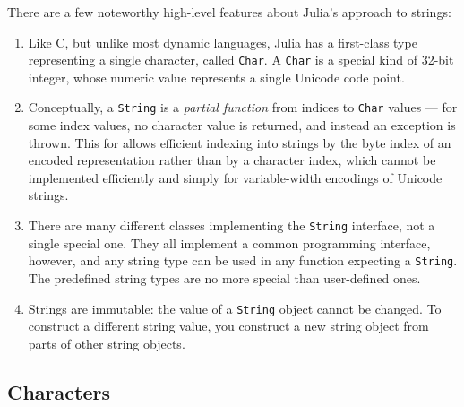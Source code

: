 \documentclass{article}
\begin{document}
There are a few noteworthy high-level features about Julia's approach to strings:
\begin{enumerate}
\item Like C, but unlike most dynamic languages, Julia has a first-class type representing a single character, called \verb|Char|.
A \verb|Char| is a special kind of 32-bit integer, whose numeric value represents a single Unicode code point.
\item Conceptually, a \verb|String| is a \emph{partial function} from indices to \verb|Char| values --- for some index values, no character value is returned, and instead an exception is thrown.
This for allows efficient indexing into strings by the byte index of an encoded representation rather than by a character index, which cannot be implemented efficiently and simply for variable-width encodings of Unicode strings.
\item There are many different classes implementing the \verb|String| interface, not a single special one.
They all implement a common programming interface, however, and any string type can be used in any function expecting a \verb|String|.
The predefined string types are no more special than user-defined ones.
\item Strings are immutable: the value of a \verb|String| object cannot be changed.
To construct a different string value, you construct a new string object from parts of other string objects.
\end{enumerate}

\subsection{Characters}
\end{document}
